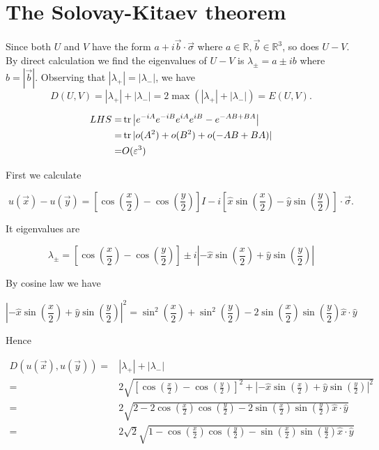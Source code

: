 \chapter{The Solovay-Kitaev theorem}

\ex Since both $U$ and $V$ have the form $a+i\vec{b}\cdot\vec{\sigma}$ where $a\in\mathbb{R},\vec{b}\in\mathbb{R}^3$, so does $U-V$.
By direct calculation we find the eigenvalues of $U-V$ is $\lambda_\pm=a\pm ib$ where $b=|\vec{b}|$.
Observing that $|\lambda_+|=|\lambda_-|$, we have
$$D(U,V)=|\lambda_+|+|\lambda_-|=2\max(|\lambda_+|+|\lambda_-|)=E(U,V).$$

\ex $$\begin{aligned}
    LHS = & \operatorname{tr}\left|e^{-iA}e^{-iB}e^{iA}e^{iB}-e^{-AB+BA}\right|
    \\ = & \operatorname{tr}|o(A^2)+o(B^2)+o(-AB+BA)|
    \\ = & O(\varepsilon^3)
\end{aligned}$$

\ex First we calculate

$$u(\vec{x})-u(\vec{y}) = \left[\cos\left(\frac{x}{2}\right)-\cos\left(\frac{y}{2}\right)\right]I-i\left[\hat{x}\sin\left(\frac{x}{2}\right)-\hat{y}\sin\left(\frac{y}{2}\right)\right]\cdot\vec{\sigma}.$$

It eigenvalues are

$$\lambda_\pm = \left[\cos\left(\frac{x}{2}\right)-\cos\left(\frac{y}{2}\right)\right] \pm i\left|-\hat{x}\sin\left(\frac{x}{2}\right)+\hat{y}\sin\left(\frac{y}{2}\right)\right|$$

By cosine law we have

$$
\left|-\hat{x}\sin\left(\frac{x}{2}\right)+\hat{y}\sin\left(\frac{y}{2}\right)\right|^2 = \sin^2\left(\frac{x}{2}\right)+\sin^2\left(\frac{y}{2}\right) - 2\sin\left(\frac{x}{2}\right)\sin\left(\frac{y}{2}\right)\hat{x}\cdot\hat{y}
$$

Hence

$$\begin{aligned}
    D(u(\vec{x}),u(\vec{y})) = & |\lambda_+|+|\lambda_-|
    \\ = & 2\sqrt{\left[\cos\left(\frac{x}{2}\right)-\cos\left(\frac{y}{2}\right)\right]^2 + \left|-\hat{x}\sin\left(\frac{x}{2}\right)+\hat{y}\sin\left(\frac{y}{2}\right)\right|^2}
    \\ = & 2\sqrt{2-2\cos\left(\frac{x}{2}\right)\cos\left(\frac{y}{2}\right) - 2\sin\left(\frac{x}{2}\right)\sin\left(\frac{y}{2}\right)\hat{x}\cdot\hat{y}}
    \\ = & 2\sqrt{2}\sqrt{1-\cos\left(\frac{x}{2}\right)\cos\left(\frac{y}{2}\right) - \sin\left(\frac{x}{2}\right)\sin\left(\frac{y}{2}\right)\hat{x}\cdot\hat{y}}
\end{aligned}$$ 

